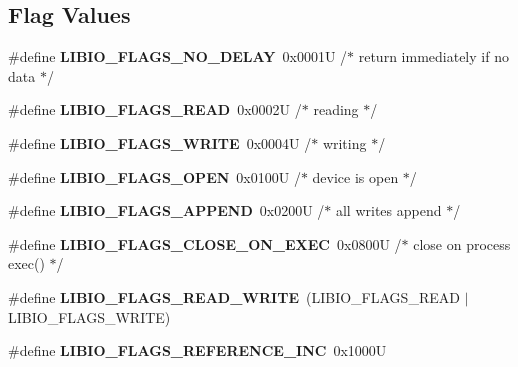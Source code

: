 \subsection*{Flag Values}
\begin{DoxyCompactItemize}
\item 
\mbox{\label{group__LibIO_ga497f4259fb7040b3a0f3cbb6b498a41e}} 
\#define {\bfseries L\+I\+B\+I\+O\+\_\+\+F\+L\+A\+G\+S\+\_\+\+N\+O\+\_\+\+D\+E\+L\+AY}~0x0001\+U  /$\ast$ return immediately if no data $\ast$/
\item 
\mbox{\label{group__LibIO_gad67104bd3dfe95c271a62571903a8023}} 
\#define {\bfseries L\+I\+B\+I\+O\+\_\+\+F\+L\+A\+G\+S\+\_\+\+R\+E\+AD}~0x0002\+U  /$\ast$ reading $\ast$/
\item 
\mbox{\label{group__LibIO_ga9a6a30369f8d7b442bfbbed47f02b85d}} 
\#define {\bfseries L\+I\+B\+I\+O\+\_\+\+F\+L\+A\+G\+S\+\_\+\+W\+R\+I\+TE}~0x0004\+U  /$\ast$ writing $\ast$/
\item 
\mbox{\label{group__LibIO_gaf62ba3d2ef5f4b91e8a80d3a80526c0e}} 
\#define {\bfseries L\+I\+B\+I\+O\+\_\+\+F\+L\+A\+G\+S\+\_\+\+O\+P\+EN}~0x0100\+U  /$\ast$ device is open $\ast$/
\item 
\mbox{\label{group__LibIO_gaf6e100d6ce65f2777b114022d418d89a}} 
\#define {\bfseries L\+I\+B\+I\+O\+\_\+\+F\+L\+A\+G\+S\+\_\+\+A\+P\+P\+E\+ND}~0x0200\+U  /$\ast$ all writes append $\ast$/
\item 
\mbox{\label{group__LibIO_gaa4efd937f70d2dee6dd824fd07b70396}} 
\#define {\bfseries L\+I\+B\+I\+O\+\_\+\+F\+L\+A\+G\+S\+\_\+\+C\+L\+O\+S\+E\+\_\+\+O\+N\+\_\+\+E\+X\+EC}~0x0800\+U  /$\ast$ close on process exec() $\ast$/
\item 
\mbox{\label{group__LibIO_ga825f3c7afb2b1a577bc77d81db504959}} 
\#define {\bfseries L\+I\+B\+I\+O\+\_\+\+F\+L\+A\+G\+S\+\_\+\+R\+E\+A\+D\+\_\+\+W\+R\+I\+TE}~(L\+I\+B\+I\+O\+\_\+\+F\+L\+A\+G\+S\+\_\+\+R\+E\+AD $\vert$ L\+I\+B\+I\+O\+\_\+\+F\+L\+A\+G\+S\+\_\+\+W\+R\+I\+TE)
\item 
\mbox{\label{group__LibIO_ga8406846af94555a0ac68e474f4d0a9c1}} 
\#define {\bfseries L\+I\+B\+I\+O\+\_\+\+F\+L\+A\+G\+S\+\_\+\+R\+E\+F\+E\+R\+E\+N\+C\+E\+\_\+\+I\+NC}~0x1000U
\end{DoxyCompactItemize}
